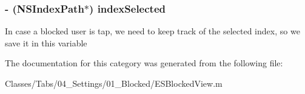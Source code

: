 \subsubsection[{index\+Selected}]{\setlength{\rightskip}{0pt plus 5cm}-\/ (N\+S\+Index\+Path$\ast$) index\+Selected\hspace{0.3cm}{\ttfamily [protected]}}\label{category_e_s_blocked_view_07_08_ae58145ea6587670264b046d9db1d1e0f}
In case a blocked user is tap, we need to keep track of the selected index, so we save it in this variable 

The documentation for this category was generated from the following file\+:\begin{DoxyCompactItemize}
\item 
Classes/\+Tabs/04\+\_\+\+Settings/01\+\_\+\+Blocked/E\+S\+Blocked\+View.\+m\end{DoxyCompactItemize}
